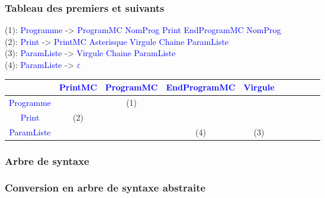 \begin{frame}
    \frametitle{Tableau des premiers et suivants\esp}
    \small
    (1): \textcolor{blue}{Programme} -> \textcolor{blue}{ProgramMC NomProg Print EndProgramMC NomProg}\\
    (2): \textcolor{blue}{Print} -> \textcolor{blue}{PrintMC Asterisque Virgule Chaine ParamListe}\\
    (3): \textcolor{blue}{ParamListe} -> \textcolor{blue}{Virgule Chaine ParamListe}\\
    (4): \textcolor{blue}{ParamListe} ->  \textcolor{blue}{$\varepsilon$} \\

    \vspace{0.25cm}
    {
    \pause
    
        \footnotesize
        \begin{tabular}{|c|c|c|c|c|c|c|c|c|c|}
            \hline
            & \textcolor{blue}{PrintMC} & \textcolor{blue}{ProgramMC} & \textcolor{blue}{EndProgramMC} & \textcolor{blue}{Virgule} \\
            \hline
            \textcolor{blue}{Programme} & & (1) & & \\
            \hline
            \textcolor{blue}{Print} & (2) & & & \\
            \hline
            \textcolor{blue}{ParamListe} & & & (4) & (3) \\
            \hline
        \end{tabular}
    
        }   
\end{frame}



\begin{frame}
    \frametitle{Arbre de syntaxe\esp}
    \begin{center}
        \scalebox{1.2}{
        
        }

    \end{center}
\end{frame}



\begin{frame}
    \frametitle{Conversion en arbre de syntaxe abstraite\esp}
    
\end{frame}


